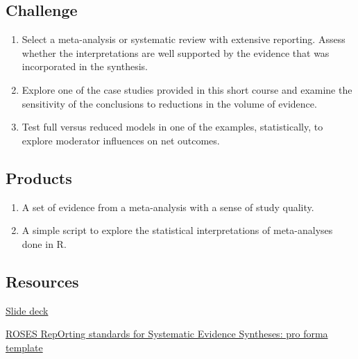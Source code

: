 \documentclass[
]{book}
\providecommand{\tightlist}{%
  \setlength{\itemsep}{0pt}\setlength{\parskip}{0pt}}
\begin{document}
\hypertarget{challenge-3}{%
\subsection*{Challenge}\label{challenge-3}}

\begin{enumerate}
\def\labelenumi{\arabic{enumi}.}
\tightlist
\item
  Select a meta-analysis or systematic review with extensive reporting. Assess whether the interpretations are well supported by the evidence that was incorporated in the synthesis.\\
\item
  Explore one of the case studies provided in this short course and examine the sensitivity of the conclusions to reductions in the volume of evidence.\\
\item
  Test full versus reduced models in one of the examples, statistically, to explore moderator influences on net outcomes.
\end{enumerate}

\hypertarget{products-3}{%
\subsection*{Products}\label{products-3}}

\begin{enumerate}
\def\labelenumi{\arabic{enumi}.}
\tightlist
\item
  A set of evidence from a meta-analysis with a sense of study quality.
\item
  A simple script to explore the statistical interpretations of meta-analyses done in R.
\end{enumerate}

\hypertarget{resources-3}{%
\subsection*{Resources}\label{resources-3}}

\href{https://figshare.com/articles/presentation/Synthesis_interpretation_framework/16608844}{Slide deck}

\href{https://environmentalevidencejournal.biomedcentral.com/articles/10.1186/s13750-018-0121-7\#Sec10}{ROSES RepOrting standards for Systematic Evidence Syntheses: pro forma template}
\end{document}
